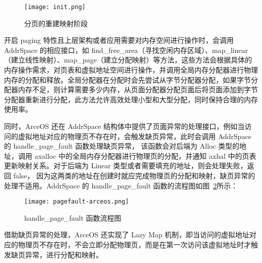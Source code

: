 \begin{figure}[H]
    \centering
    \texttt{[image: init.png]}
    \caption{分页的重建映射阶段}
    \label{fig:init}
\end{figure}

开启 paging 特性且上层架构或者应用需要对内存空间进行操作时，会调用 AddrSpace 的相应接口，如 find\_free\_area（寻找空闲内存区域）、map\_linear（建立线性映射）、map\_page（建立分配映射）等方法，这些方法会根据具体的内存操作需求，对页表和虚拟地址空间进行操作，并调用全局内存分配器进行物理内存的分配和释放。全局分配器在分配时会先尝试从字节分配器分配，如果字节分配器内存不足，则计算需要多少内存，从页面分配器分配页面后将页面添加到字节分配器重新进行分配，此方法允许高效处理小型和大型分配，同时保持合理的内存使用率。

同时，ArceOS 还在 AddrSpace 结构体中提供了页面异常的处理接口，例如当访问的虚拟地址对应的物理页不存在时，会触发缺页异常，此时会调用 AddrSpace 的 handle\_page\_fault 函数处理缺页异常，
该函数会对后端为 Alloc 类型的地址，调用 axalloc 中的全局内存分配器进行物理页的分配，并通知 axhal 中的页表更新映射关系。对于后端为 Linear 类型或者需要填充的地址，则会处理失败，返回 false，
因为这两类的地址在创建时就应完成物理页的分配和映射，缺页异常的处理不适用。AddrSpace 的 handle\_page\_fault 函数的流程图如图~\ref{fig:handle-page-fault-arceos}所示：

\begin{figure}[H]
    \centering
    \texttt{[image: pagefault-arceos.png]}
    \caption{handle\_page\_fault 函数流程图}
    \label{fig:handle-page-fault-arceos}
\end{figure}


借助缺页异常的处理，ArceOS 还实现了 Lazy Map 机制，即当访问的虚拟地址对应的物理页不存在时，不会立即分配物理页，而是在第一次访问该虚拟地址时才触发缺页异常，进行分配和映射。